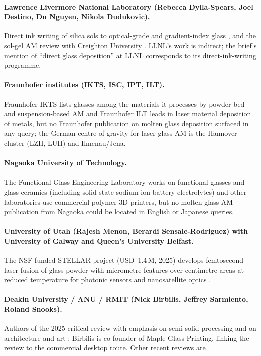 \paragraph{Lawrence Livermore National Laboratory (Rebecca Dylla-Spears, Joel Destino, Du Nguyen, Nikola Dudukovic).} Direct ink writing of silica sols to optical-grade and gradient-index glass \citep{nguyen2017,destino2018,llnl2018}, and the sol-gel AM review with Creighton University \citep{solgel2025}. LLNL's work is indirect; the brief's mention of ``direct glass deposition'' at LLNL corresponds to its direct-ink-writing programme.

\paragraph{Fraunhofer institutes (IKTS, ISC, IPT, ILT).} Fraunhofer IKTS lists glasses among the materials it processes by powder-bed and suspension-based AM and Fraunhofer ILT leads in laser material deposition of metals, but no Fraunhofer publication on molten glass deposition surfaced in any query; the German centre of gravity for laser glass AM is the Hannover cluster (LZH, LUH) and Ilmenau/Jena.

\paragraph{Nagaoka University of Technology.} The Functional Glass Engineering Laboratory works on functional glasses and glass-ceramics (including solid-state sodium-ion battery electrolytes) and other laboratories use commercial polymer 3D printers, but no molten-glass AM publication from Nagaoka could be located in English or Japanese queries.

\paragraph{University of Utah (Rajesh Menon, Berardi Sensale-Rodriguez) with University of Galway and Queen's University Belfast.} The NSF-funded STELLAR project (USD~1.4\,M, 2025) develops femtosecond-laser fusion of glass powder with micrometre features over centimetre areas at reduced temperature for photonic sensors and nanosatellite optics \citep{utah2025}.

\paragraph{Deakin University / ANU / RMIT (Nick Birbilis, Jeffrey Sarmiento, Roland Snooks).} Authors of the 2025 critical review with emphasis on semi-solid processing and on architecture and art \citep{critical2025}; Birbilis is co-founder of Maple Glass Printing, linking the review to the commercial desktop route. Other recent reviews are \citet{zhang2021review,matdes2023review,micromachines2022,jmmp2026review,multimat2026}.

